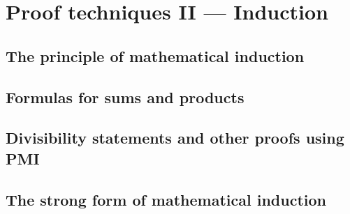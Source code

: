 
\chapter{Proof techniques II --- Induction}


\section{The principle of mathematical induction}






 
\newpage

\section{Formulas for sums and products}





\newpage

\section[Other proofs using PMI]{Divisibility statements and other proofs using PMI}





\newpage
 
\section{The strong form of mathematical induction}






